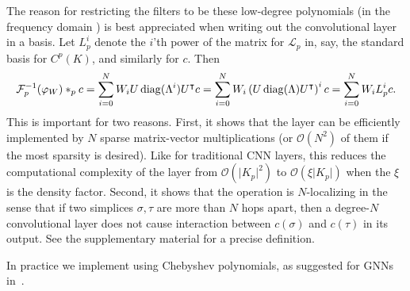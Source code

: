 The reason for restricting the filters to be these low-degree polynomials (in the frequency domain ) is best appreciated when writing out the convolutional layer in a basis. Let $L^i_p$ denote the $i$'th power of the matrix for $\mathcal{L}_p$ in, say, the standard basis for $C^p(K)$, and similarly for $c$. Then
\begin{equation}
  \mathcal{F}^{-1}_p(\varphi_W)\ast_p c = \sum_{i=0}^N W_iU\operatorname{diag}(\Lambda^i)U^{\intercal} c = \sum_{i=0}^N W_i\left(U\operatorname{diag}(\Lambda)U^{\intercal}\right)^i c = \sum_{i=0}^NW_iL^i_pc. \label{eq:filter}
\end{equation}
This is important for two reasons. First, it shows that the layer can be efficiently implemented by $N$ sparse matrix-vector multiplications (or $\mathcal{O}(N^2)$ of them if the most sparsity is desired). Like for traditional CNN layers, this reduces the computational complexity of the layer from $\mathcal{O}(\lvert K_p\rvert^2)$ to $\mathcal{O}(\xi\lvert K_p\rvert)$ when the $\xi$ is the density factor. Second, it shows that the operation is $N$-localizing in the sense that if two simplices $\sigma,\tau$ are more than $N$ hops apart, then a degree-$N$ convolutional layer does not cause interaction between $c(\sigma)$ and $c(\tau)$ in its output. See the supplementary material for a precise definition.

In practice we implement  using Chebyshev polynomials, as suggested for GNNs in~\cite{defferrard2016convolutional}.

